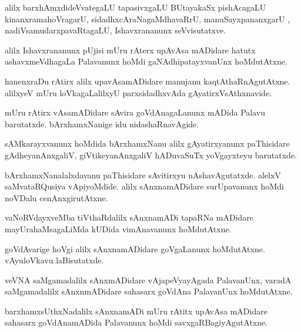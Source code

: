 \documentclass{article}
\begin{document}
\begin{mn}
alilx barxhAmxdideVvategaLU tapasivxgaLU BUtayakaSx pishAcagaLU kinanxramahoVragarU, 
sidadhxcAraNagaMdhavaRrU, manuSayxpananxgarU , nadiVsamudarxpavaRtagaLU, Ishavxrananunx 
seVvisutatxve.
\end{mn}

\begin{mn}
alilx Ishavxrananunx pUjisi mUru rAterx upAvAsa mADidare hatutx ashavxmeVdhagaLa Palavanunx hoMdi 
gaNAdhipatayxvanUnx hoMdutAtxne. 
\end{mn}

\begin{mn}
hanenxraDu rAtirx alilx upavAsamADidare manujanu kaqtAthaRnAgutAtxne. alilxyeV mUru loVkagaLalilxyU 
parxsidadhxvAda gAyatirxVsAthxnavide.
\end{mn}

\begin{mn}
mUru rAtirx vAsamADidare sAvira goVdAnagaLanunx mADida Palavu barutatxde. bArxhamxNanige idu 
nidashaRnavAgide.
\end{mn}

\begin{mn}
sAMkarayxvanunx hoMdida bArxhamxNanu alilx gAyatirxyanunx paThisidare gAdheyanAnxgaliV, 
giVtikeyanAnxgaliV hADuvaSuTx yoVgayxteyu barutatxde.
\end{mn}

\begin{mn}
bArxhamxNanalalxdavanu paThisidare sAvitirxyu nAshavAgutatxde. alelxV saMvataRQusiya vApiyoMdide. 
alilx sAnxnamADidare surUpavanunx hoMdi noVDalu cenAnxgirutAtxne.
\end{mn}

\begin{mn}
vaNoRVdayxveMba tiVthaRdalilx sAnxnamADi tapaRNa mADidare mayUrahaMsagaLiMda kUDida vimAnavanunx 
hoMdutAtxne.
\end{mn}

\begin{mn}
goVdAvarige hoVgi alilx sAnxnamADidare goVgaLanunx hoMdutAtxne. vAyuloVkavu laBisutatxde.
\end{mn}

\begin{mn}
veVNA saMgamadalilx sAnxmADidare vAjapeVyayAgada PalavanUnx, varadA saMgamadalilx sAnxnmADidare 
sahasarx goVdAna PalavanUnx hoMdutAtxne.
\end{mn}

\begin{mn}
barxhamxsUthxNadalilx sAnxnamADi mUru rAtitx upAvAsa mADidare sahasarx goVdAnamADida Palavanunx 
hoMdi savxgaRBagiyAgutAtxne.
\end{mn}
\end{document}
